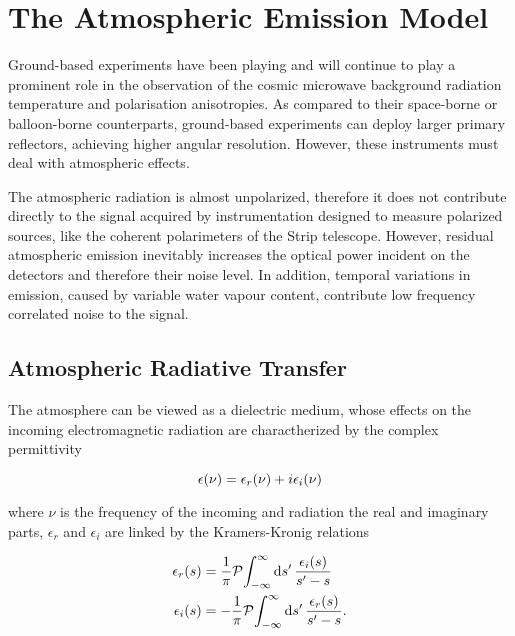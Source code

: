 \chapter{The Atmospheric Emission Model}

Ground-based experiments have been playing and will continue to play a
prominent role in the observation of the cosmic microwave background
radiation temperature and polarisation anisotropies. As compared to
their space-borne or balloon-borne counterparts, ground-based experiments
can deploy larger primary reflectors, achieving higher angular resolution.
However, these instruments must deal with atmospheric effects.

The atmospheric radiation is almost unpolarized, therefore it does not
contribute directly to the signal acquired by instrumentation designed to
measure polarized sources, like the coherent polarimeters of the Strip
telescope. However, residual atmospheric emission inevitably increases the
optical power incident on the detectors and therefore their noise level. In
addition, temporal variations in emission, caused by variable water vapour
content, contribute low frequency correlated noise to the signal.

\section{Atmospheric Radiative Transfer}

The atmosphere can be viewed as a dielectric medium, whose effects on the
incoming electromagnetic radiation are charactherized by the complex permittivity

\begin{equation}
        \epsilon\qty(\nu) = \epsilon_r\qty(\nu) + i\epsilon_i\qty(\nu)
\end{equation}

where $\nu$ is the frequency of the incoming and radiation the real and
imaginary parts, $\epsilon_r$ and $\epsilon_i$ are linked by the
Kramers-Kronig relations

\begin{align}
        \epsilon_r\qty(s) & = \frac{1}{\pi}
        \principalvalue{\int^\infty_{-\infty}\dd{s'}
        \frac{\epsilon_i\qty(s)}{s' - s}} \label{eq:kk_relations_1} \\
        \epsilon_i\qty(s) & = -\frac{1}{\pi}
        \principalvalue{\int^\infty_{-\infty}\dd{s'}
        \frac{\epsilon_r\qty(s)}{s' - s}} \label{eq:kk_relations_2}.
\end{align}

